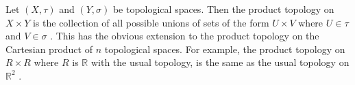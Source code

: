 Let  $ (X, \tau ) $  and  $ (Y, \sigma ) $  be
topological spaces. Then the product
topology on  $ X \times Y $  is the collection of all possible unions of
sets of the form  $ U \times V $  where  $ U \in  \tau  $  and  $ V \in  \sigma  $ .
This has the obvious extension to the product topology on the
Cartesian product of  $ n $ 
topological spaces. For example, the product topology on  $ R \times R $ 
where  $ R $  is  $  \mathbb{R} $  with the usual topology, is the same as the usual
topology on  $  \mathbb{R}^2 $ .
